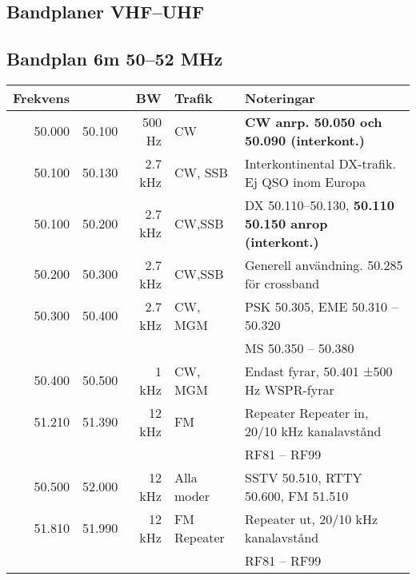 \scriptsize

\subsection{Bandplaner VHF--UHF}

\subsection{Bandplan 6m 50--52 MHz}

\begin{tabular}{rrrll}

\textbf{Frekvens} &  & \textbf{BW} & \textbf{Trafik} & \textbf{Noteringar} \\ \hline

50.000 & 50.100 & 500 Hz  & CW          & \textbf{CW anrp. 50.050 och 50.090 (interkont.)}             \\ \hline
50.100 & 50.130 & 2.7 kHz & CW, SSB     & Interkontinental DX-trafik. Ej QSO inom Europa               \\ \hline
50.100 & 50.200 & 2.7 kHz & CW,SSB      & DX 50.110--50.130, \textbf{50.110 50.150 anrop (interkont.)} \\ \hline
50.200 & 50.300 & 2.7 kHz & CW,SSB      & Generell användning. 50.285 för crossband                    \\ \hline
50.300 & 50.400 & 2.7 kHz & CW, MGM     & PSK 50.305, EME 50.310 – 50.320                              \\
       &        &         &             & MS 50.350 – 50.380                                           \\ \hline
50.400 & 50.500 & 1 kHz   & CW, MGM     & Endast fyrar, 50.401 ±500 Hz WSPR-fyrar                      \\ \hline
51.210 & 51.390 & 12 kHz  & FM          & Repeater Repeater in, 20/10 kHz kanalavstånd                 \\
       &        &         &             & RF81 – RF99                                                  \\ \hline
50.500 & 52.000 & 12 kHz  & Alla moder  & SSTV 50.510, RTTY 50.600, FM 51.510                          \\ \hline
51.810 & 51.990 & 12 kHz  & FM Repeater & Repeater ut, 20/10 kHz kanalavstånd                          \\
       &        &         &             & RF81 – RF99                                                  \\ \hline
\end{tabular}

